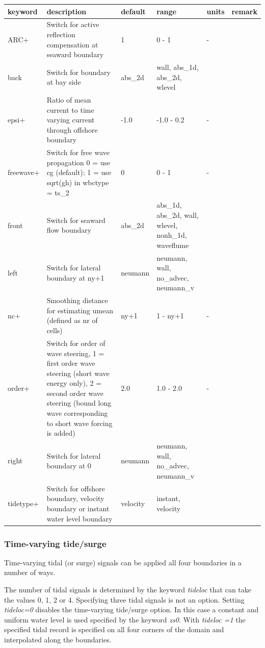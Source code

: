 \documentclass{article}
\begin{document}
\begin{tabular}{|p{0.7in}|p{1.1in}|p{0.6in}|p{0.8in}|p{0.4in}|p{0.6in}|} \hline 
keyword & description & default & range & units & remark \\ \hline 
ARC+ & Switch for active reflection compensation at seaward boundary & 1 & 0 - 1 & - &  \\ \hline 
back & Switch for boundary at bay side & abs\_2d & wall, abs\_1d, abs\_2d, wlevel &  &  \\ \hline 
epsi+ & Ratio of mean current to time varying current through offshore boundary & -1.0 & -1.0 - 0.2 & - &  \\ \hline 
freewave+ & Switch for free wave propagation 0 = use cg (default); 1 = use sqrt(gh) in wbctype = ts\_2 & 0 & 0 - 1 & - &  \\ \hline 
front & Switch for seaward flow boundary & abs\_2d & abs\_1d, abs\_2d, wall, wlevel, nonh\_1d, waveflume &  &  \\ \hline 
left & Switch for lateral boundary at ny+1 & neumann & neumann, wall, no\_advec, neumann\_v &  &  \\ \hline 
nc+ & Smoothing distance for estimating umean (defined as nr of cells) & ny+1 & 1 - ny+1 & - &  \\ \hline 
order+ & Switch for order of wave steering, 1 = first order wave steering (short wave energy only), 2 = second order wave steering (bound long wave corresponding to short wave forcing is added) & 2.0 & 1.0 - 2.0 & - &  \\ \hline 
right & Switch for lateral boundary at 0 & neumann & neumann, wall, no\_advec, neumann\_v &  &  \\ \hline 
tidetype+ & Switch for offshore boundary, velocity boundary or instant water level boundary & velocity & instant, velocity &  &  \\ \hline 
\end{tabular}


\subsubsection{ Time-varying tide/surge}

\noindent Time-varying tidal (or surge) signals can be applied all four boundaries in a number of ways. 

\noindent The number of tidal signals is determined by the keyword \textit{tideloc} that can take the values 0, 1, 2 or 4. Specifying three tidal signals is not an option. Setting \textit{tideloc=0} disables the time-varying tide/surge option. In this case a constant and uniform water level is used specified by the keyword \textit{zs0}. With \textit{tideloc =1} the specified tidal record is specified on all four corners of the domain and interpolated along the boundaries.
\end{document}
